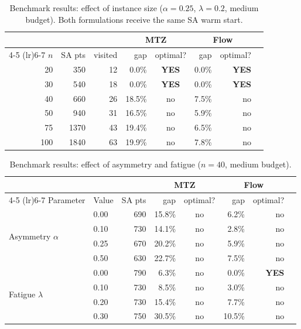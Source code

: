 \documentclass[preprint,11pt]{elsarticle}
\begin{document}
\begin{table}[H]
\centering
\caption{Benchmark results: effect of instance size ($\alpha = 0.25$, $\lambda = 0.2$, medium budget). Both formulations receive the same SA warm start.}
\label{tab:bench_size}
\begin{tabular}{rrrrcrrc}
\toprule
& & & \multicolumn{2}{c}{\textbf{MTZ}} & \multicolumn{2}{c}{\textbf{Flow}} \\
\cmidrule(lr){4-5} \cmidrule(lr){6-7}
$n$ & SA pts & visited & gap & optimal? & gap & optimal? \\
\midrule
20  &  350 & 12 &  0.0\% & \textbf{YES} &  0.0\% & \textbf{YES} \\
30  &  540 & 18 &  0.0\% & \textbf{YES} &  0.0\% & \textbf{YES} \\
40  &  660 & 26 & 18.5\% & no &  7.5\% & no \\
50  &  940 & 31 & 16.5\% & no &  5.9\% & no \\
75  & 1370 & 43 & 19.4\% & no &  6.5\% & no \\
100 & 1840 & 63 & 19.9\% & no &  7.8\% & no \\
\bottomrule
\end{tabular}
\end{table}

\begin{table}[H]
\centering
\caption{Benchmark results: effect of asymmetry and fatigue ($n = 40$, medium budget).}
\label{tab:bench_params}
\begin{tabular}{llrrcrrc}
\toprule
& & & \multicolumn{2}{c}{\textbf{MTZ}} & \multicolumn{2}{c}{\textbf{Flow}} \\
\cmidrule(lr){4-5} \cmidrule(lr){6-7}
Parameter & Value & SA pts & gap & optimal? & gap & optimal? \\
\midrule
\multirow{4}{*}{Asymmetry $\alpha$}
& 0.00 &  690 & 15.8\% & no &  6.2\% & no \\
& 0.10 &  730 & 14.1\% & no &  2.8\% & no \\
& 0.25 &  670 & 20.2\% & no &  5.9\% & no \\
& 0.50 &  630 & 22.7\% & no &  7.5\% & no \\
\midrule
\multirow{4}{*}{Fatigue $\lambda$}
& 0.00 &  790 &  6.3\% & no &  0.0\% & \textbf{YES} \\
& 0.10 &  730 &  8.5\% & no &  3.0\% & no \\
& 0.20 &  730 & 15.4\% & no &  7.7\% & no \\
& 0.30 &  750 & 30.5\% & no & 10.5\% & no \\
\bottomrule
\end{tabular}
\end{table}
\end{document}
